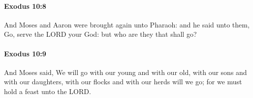 		\paragraph{Exodus 10:8} %
			\label{EXODUS-10-8}

			And Moses and Aaron were brought again unto Pharaoh: and he said unto them, Go, serve the LORD your God: but who are they that shall go?


		\paragraph{Exodus 10:9} %
			\label{EXODUS-10-9}

			And Moses said, We will go with our young and with our old, with our sons and with our daughters, with our flocks and with our herds will we go; for we must hold a feast unto the LORD.


